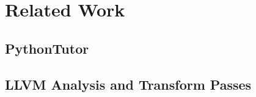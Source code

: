 \section{Related Work}

\subsection{PythonTutor}


\subsection{LLVM Analysis and Transform Passes}

